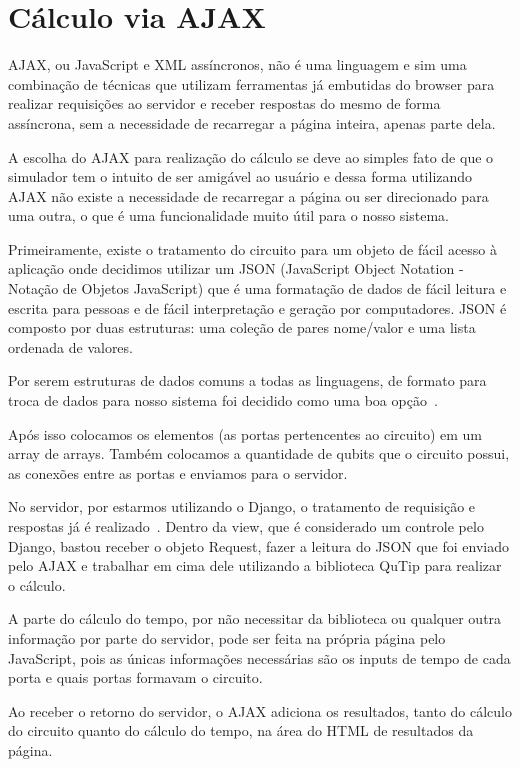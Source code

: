 \documentclass[a4paper, 12pt, oneside]{book}
\begin{document}
\section{Cálculo via AJAX}

AJAX, ou JavaScript e XML assíncronos, não é uma linguagem e sim uma combinação de técnicas que utilizam ferramentas já embutidas do browser para realizar requisições ao servidor e receber respostas do mesmo de forma assíncrona, sem a necessidade de recarregar a página inteira, apenas parte dela.

A escolha do AJAX para realização do cálculo se deve ao simples fato de que o simulador tem o intuito de ser amigável ao usuário e dessa forma utilizando AJAX não existe a necessidade de recarregar a página ou ser direcionado para uma outra, o que é uma funcionalidade muito útil para o nosso sistema.

Primeiramente, existe o tratamento do circuito para um objeto de fácil acesso à aplicação onde decidimos utilizar um JSON (JavaScript Object Notation - Notação de Objetos JavaScript) que é uma formatação de dados de fácil leitura e escrita para pessoas e de fácil interpretação e geração por computadores. JSON é composto por duas estruturas: uma coleção de pares nome/valor e uma lista ordenada de valores.

Por serem estruturas de dados comuns a todas as linguagens, de formato para troca de dados para nosso sistema foi decidido como uma boa opção~\cite{json}.

Após isso colocamos os elementos (as portas pertencentes ao circuito) em um array de arrays. Também colocamos a quantidade de qubits que o circuito possui, as conexões entre as portas e enviamos para o servidor.

No servidor, por estarmos utilizando o Django, o tratamento de requisição e respostas já é realizado~\cite{django-req-resp}. Dentro da view, que é considerado um controle pelo Django, bastou receber o objeto Request, fazer a leitura do JSON que foi enviado pelo AJAX e trabalhar em cima dele utilizando a biblioteca QuTip para realizar o cálculo.

A parte do cálculo do tempo, por não necessitar da biblioteca ou qualquer outra informação por parte do servidor, pode ser feita na própria página pelo JavaScript, pois as únicas informações necessárias são os inputs de tempo de cada porta e quais portas formavam o circuito.

Ao receber o retorno do servidor, o AJAX adiciona os resultados, tanto do cálculo do circuito quanto do cálculo do tempo, na área do HTML de resultados da página.
\end{document}
